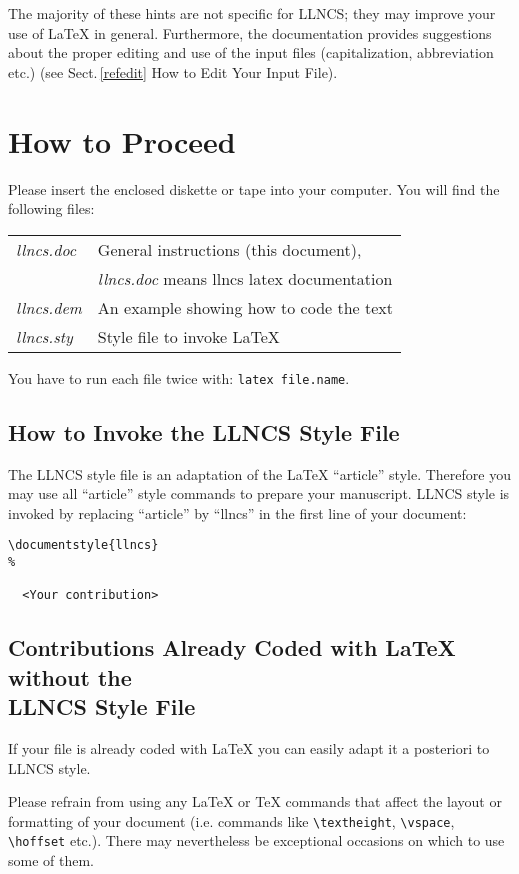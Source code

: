 The majority of these hints are not specific for LLNCS; they may improve
your use of \LaTeX{} in general.
Furthermore, the documentation provides suggestions about the proper
editing and use
of the input files (capitalization, abbreviation etc.) (see
Sect.\,\ref{refedit} How to Edit Your Input File).
%
\section{How to Proceed}
%
Please insert the enclosed diskette or tape into your computer. You will
find the following files:
\begin{flushleft}
\begin{tabular}{@{}p{2.5cm}l}
{\it llncs.doc}  & General instructions (this document),\\
        & {\it llncs.doc} means llncs latex documentation\\
{\it llncs.dem}  & An example showing how to code the text\\
{\it llncs.sty}  & Style file to invoke  \LaTeX{}
\end{tabular}
\end{flushleft}
You have to run each file twice with: \verb|latex file.name|.
%
\subsection{How to Invoke the LLNCS Style File}
%
The LLNCS style file is an adaptation of the \LaTeX{} ``article'' style.
Therefore you may use all ``article'' style commands to prepare your
manuscript.
LLNCS style is invoked by replacing ``article'' by ``llncs'' in the
first
line of your document:
\begin{verbatim}
\documentstyle{llncs}
%

  <Your contribution>

\end{verbatim}
%
\subsection{Contributions Already  Coded with \protect\LaTeX{} without
the \protect\\ LLNCS Style File}
%
If your file is already coded with \LaTeX{} you can easily
adapt it a posteriori to LLNCS style.

Please refrain from using any \LaTeX{} or \TeX{} commands
that affect the layout or formatting of your document (i.e. commands
like \verb|\textheight|, \verb|\vspace|, \verb|\hoffset| etc.).
There may nevertheless be exceptional occasions on which to
use some of them.

